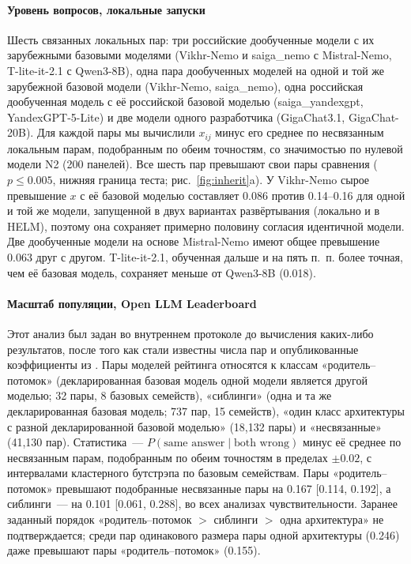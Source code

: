 \documentclass[preprint,12pt,authoryear]{elsarticle}
\begin{document}
\paragraph{Уровень вопросов, локальные запуски} Шесть связанных локальных пар: три российские дообученные модели с их зарубежными базовыми моделями (Vikhr-Nemo и saiga\_nemo с Mistral-Nemo, T-lite-it-2.1 с Qwen3-8B), одна пара дообученных моделей на одной и той же зарубежной базовой модели (Vikhr-Nemo, saiga\_nemo), одна российская дообученная модель с её российской базовой моделью (saiga\_yandexgpt, YandexGPT-5-Lite) и две модели одного разработчика (GigaChat3.1, GigaChat-20B). Для каждой пары мы вычислили $x_{ij}$ минус его среднее по несвязанным локальным парам, подобранным по обеим точностям, со значимостью по нулевой модели N2 (200 панелей). Все шесть пар превышают свои пары сравнения ($p\le0.005$, нижняя граница теста; рис.~\ref{fig:inherit}a). У Vikhr-Nemo сырое превышение $x$ с её базовой моделью составляет 0.086 против 0.14--0.16 для одной и той же модели, запущенной в двух вариантах развёртывания (локально и в HELM), поэтому она сохраняет примерно половину согласия идентичной модели. Две дообученные модели на основе Mistral-Nemo имеют общее превышение 0.063 друг с другом. T-lite-it-2.1, обученная дальше и на пять п.~п. более точная, чем её базовая модель, сохраняет меньше от Qwen3-8B (0.018).

\paragraph{Масштаб популяции, Open LLM Leaderboard} Этот анализ был задан во внутреннем протоколе до вычисления каких-либо результатов, после того как стали известны числа пар и опубликованные коэффициенты из \citet{kim2025correlated}. Пары моделей рейтинга относятся к классам «родитель--потомок» (декларированная базовая модель одной модели является другой моделью; 32 пары, 8 базовых семейств), «сиблинги» (одна и та же декларированная базовая модель; 737 пар, 15 семейств), «один класс архитектуры с разной декларированной базовой моделью» (18,132 пары) и «несвязанные» (41,130 пар). Статистика~--- $P(\text{same answer} \mid \text{both wrong})$ минус её среднее по несвязанным парам, подобранным по обеим точностям в пределах $\pm0.02$, с интервалами кластерного бутстрэпа по базовым семействам. Пары «родитель--потомок» превышают подобранные несвязанные пары на 0.167 [0.114, 0.192], а сиблинги~--- на 0.101 [0.061, 0.288], во всех анализах чувствительности. Заранее заданный порядок «родитель--потомок $>$ сиблинги $>$ одна архитектура» не подтверждается; среди пар одинакового размера пары одной архитектуры (0.246) даже превышают пары «родитель--потомок» (0.155).
\end{document}

